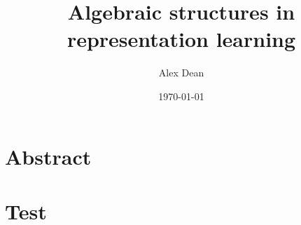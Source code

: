 \documentclass[justified]{LaTeX/tufte-book}
\title{Algebraic structures in representation learning}
\author{Alex Dean}
\date{\today}
\begin{document}
\maketitle

\doublespacing
\frontmatter

\begin{fullwidth}
    \singlespacing
    \tableofcontents
\end{fullwidth}

\begin{fullwidth}
    \listoffigures
    \listoftables
\end{fullwidth}

\chapter{Abstract}

\mainmatter


\chapter{Test}


\backmatter
\begin{fullwidth}
    \printbibliography
\end{fullwidth}
\end{document}
